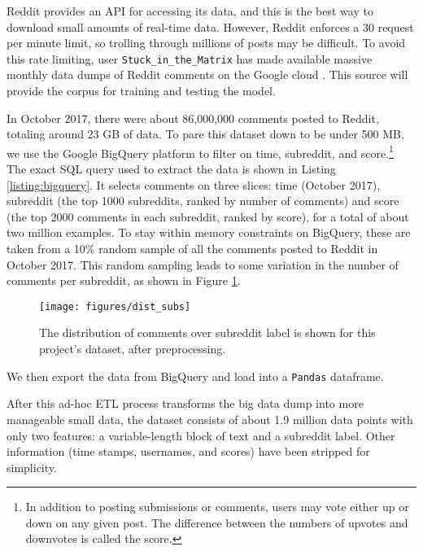 \documentclass[]{article}
\begin{document}
Reddit provides an API for accessing its data, and this is the best way to download small amounts of real-time data. However, Reddit enforces a 30 request per minute limit, so trolling through millions of posts may be difficult. To avoid this rate limiting, user \verb|Stuck_in_the_Matrix| has made available massive monthly data dumps of Reddit comments on the Google cloud \cite{data-dump}. This source will provide the corpus for training and testing the model. 

In October 2017, there were about 86,000,000 comments posted to Reddit, totaling around 23 GB of data. To pare this dataset down to be under 500 MB, we use the Google BigQuery platform to filter on time, subreddit, and score.\footnote{In addition to posting submissions or comments, users may vote either up or down on any given post. The difference between the numbers of upvotes and downvotes is called the score.} The exact SQL query used to extract the data is shown in Listing \ref{listing:bigquery}. It selects comments on three slices: time (October 2017), subreddit (the top 1000 subreddits, ranked by number of comments) and score (the top 2000 comments in each subreddit, ranked by score), for a total of about two million examples. To stay within memory constraints on BigQuery, these are taken from a 10\% random sample of all the comments posted to Reddit in October 2017. This random sampling leads to some variation in the number of comments per subreddit, as shown in Figure \ref{fig:comment_hist}.
\begin{figure}[h]
\centering
\texttt{[image: figures/dist\_subs]}
\caption{The distribution of comments over subreddit label is shown for this project's dataset, after preprocessing.}
\label{fig:comment_hist}
\end{figure}
We then export the data from BigQuery and load into a \texttt{Pandas} dataframe. 

After this ad-hoc ETL process transforms the big data dump into more manageable small data, the dataset consists of about 1.9 million data points with only two features: a variable-length block of text and a subreddit label. Other information (time stamps, usernames, and scores) have been stripped for simplicity.
\end{document}
